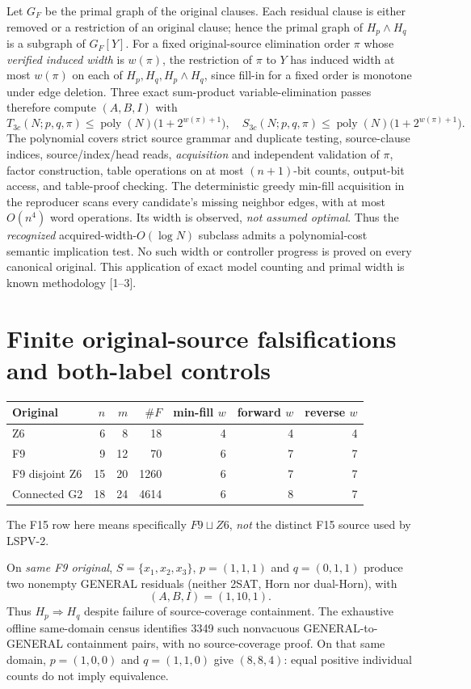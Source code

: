 \documentclass[11pt]{article}
\begin{document}
Let $G_F$ be the primal graph of the original clauses. Each residual clause is either removed or a restriction of an original clause; hence the primal graph of $H_p\wedge H_q$ is a subgraph of $G_F[Y]$. For a fixed original-source elimination order $\pi$ whose \emph{verified induced width} is $w(\pi)$, the restriction of $\pi$ to $Y$ has induced width at most $w(\pi)$ on each of $H_p,H_q,H_p\wedge H_q$, since fill-in for a fixed order is monotone under edge deletion. Three exact sum-product variable-elimination passes therefore compute $(A,B,I)$ with
\[
 T_{3c}(N;p,q,\pi)\le \operatorname{poly}(N)\bigl(1+2^{w(\pi)+1}\bigr),\quad
 S_{3c}(N;p,q,\pi)\le \operatorname{poly}(N)\bigl(1+2^{w(\pi)+1}\bigr).
\]
The polynomial covers strict source grammar and duplicate testing, source-clause indices, source/index/head reads, \emph{acquisition} and independent validation of $\pi$, factor construction, table operations on at most $(n+1)$-bit counts, output-bit access, and table-proof checking. The deterministic greedy min-fill acquisition in the reproducer scans every candidate's missing neighbor edges, with at most $O(n^4)$ word operations. Its width is observed, \emph{not assumed optimal}. Thus the \emph{recognized} acquired-width-$O(\log N)$ subclass admits a polynomial-cost semantic implication test. No such width or controller progress is proved on every canonical original. This application of exact model counting and primal width is known methodology [1--3].
\section{Finite original-source falsifications and both-label controls}
\begin{center}
\begin{tabular}{lrrrrrr}
\toprule
Original & $n$ & $m$ & $\#F$ & min-fill $w$ & forward $w$ & reverse $w$\\\midrule
Z6 & 6 & 8 & 18 & 4 & 4 & 4\\
F9 & 9 & 12 & 70 & 6 & 7 & 7\\
F9 disjoint Z6 & 15 & 20 & 1260 & 6 & 7 & 7\\
Connected G2 & 18 & 24 & 4614 & 6 & 8 & 7\\
\bottomrule
\end{tabular}
\end{center}
The F15 row here means specifically $F9\sqcup Z6$, \emph{not} the distinct F15 source used by LSPV-2.

On \emph{same F9 original}, $S=\{x_1,x_2,x_3\}$, $p=(1,1,1)$ and $q=(0,1,1)$ produce two nonempty GENERAL residuals (neither 2SAT, Horn nor dual-Horn), with
\[
 \boxed{(A,B,I)=(1,10,1).}
\]
Thus $H_p\Rightarrow H_q$ despite failure of source-coverage containment. The exhaustive offline same-domain census identifies 3349 such nonvacuous GENERAL-to-GENERAL containment pairs, with no source-coverage proof. On that same domain, $p=(1,0,0)$ and $q=(1,1,0)$ give $(8,8,4)$: equal positive individual counts do not imply equivalence.
\end{document}
